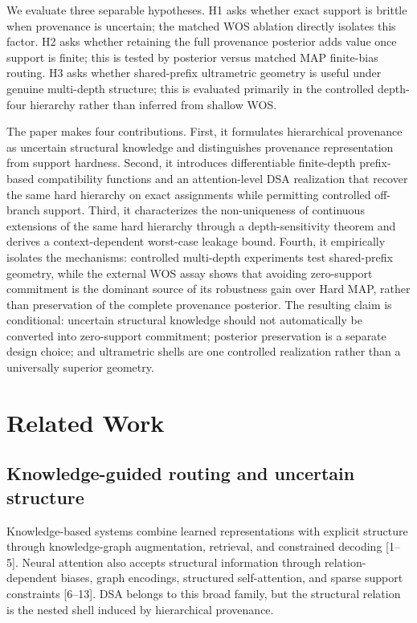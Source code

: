 \documentclass[preprint,11pt]{elsarticle}
\begin{document}
We evaluate three separable hypotheses. H1 asks whether exact support is brittle when provenance is uncertain; the matched WOS ablation directly isolates this factor. H2 asks whether retaining the full provenance posterior adds value once support is finite; this is tested by posterior versus matched MAP finite-bias routing. H3 asks whether shared-prefix ultrametric geometry is useful under genuine multi-depth structure; this is evaluated primarily in the controlled depth-four hierarchy rather than inferred from shallow WOS.

The paper makes four contributions. First, it formulates hierarchical provenance as uncertain structural knowledge and distinguishes provenance representation from support hardness. Second, it introduces differentiable finite-depth prefix-based compatibility functions and an attention-level DSA realization that recover the same hard hierarchy on exact assignments while permitting controlled off-branch support. Third, it characterizes the non-uniqueness of continuous extensions of the same hard hierarchy through a depth-sensitivity theorem and derives a context-dependent worst-case leakage bound. Fourth, it empirically isolates the mechanisms: controlled multi-depth experiments test shared-prefix geometry, while the external WOS assay shows that avoiding zero-support commitment is the dominant source of its robustness gain over Hard MAP, rather than preservation of the complete provenance posterior. The resulting claim is conditional: uncertain structural knowledge should not automatically be converted into zero-support commitment; posterior preservation is a separate design choice; and ultrametric shells are one controlled realization rather than a universally superior geometry.

\section{Related Work}
\subsection{Knowledge-guided routing and uncertain structure}
Knowledge-based systems combine learned representations with explicit structure through knowledge-graph augmentation, retrieval, and constrained decoding [1--5]. Neural attention also accepts structural information through relation-dependent biases, graph encodings, structured self-attention, and sparse support constraints [6--13]. DSA belongs to this broad family, but the structural relation is the nested shell induced by hierarchical provenance.
\end{document}
